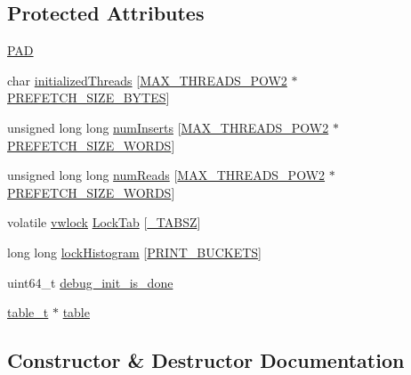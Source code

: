 \subsection*{Protected Attributes}
\begin{DoxyCompactItemize}
\item 
\hyperlink{classindex__base_aecdbc18775b6db4572392085e82e12d2}{P\+AD}
\item 
char \hyperlink{classindex__base_a2b876c502b9e52ab748db529dae6a403}{initialized\+Threads} \mbox{[}\hyperlink{plaf_8h_ac1585a3455dd3e33e877e588be9e466b}{M\+A\+X\+\_\+\+T\+H\+R\+E\+A\+D\+S\+\_\+\+P\+O\+W2} $\ast$\hyperlink{plaf_8h_a9492d3f4847aa8514510373df7ad0e73}{P\+R\+E\+F\+E\+T\+C\+H\+\_\+\+S\+I\+Z\+E\+\_\+\+B\+Y\+T\+ES}\mbox{]}
\item 
unsigned long long \hyperlink{classindex__base_a174339e599ecc8f223744c01ebeef0d3}{num\+Inserts} \mbox{[}\hyperlink{plaf_8h_ac1585a3455dd3e33e877e588be9e466b}{M\+A\+X\+\_\+\+T\+H\+R\+E\+A\+D\+S\+\_\+\+P\+O\+W2} $\ast$\hyperlink{plaf_8h_af55592679e3b40dd3c45ec6faef1b053}{P\+R\+E\+F\+E\+T\+C\+H\+\_\+\+S\+I\+Z\+E\+\_\+\+W\+O\+R\+DS}\mbox{]}
\item 
unsigned long long \hyperlink{classindex__base_ac947600e88bf99120d4a2bfb7e3be395}{num\+Reads} \mbox{[}\hyperlink{plaf_8h_ac1585a3455dd3e33e877e588be9e466b}{M\+A\+X\+\_\+\+T\+H\+R\+E\+A\+D\+S\+\_\+\+P\+O\+W2} $\ast$\hyperlink{plaf_8h_af55592679e3b40dd3c45ec6faef1b053}{P\+R\+E\+F\+E\+T\+C\+H\+\_\+\+S\+I\+Z\+E\+\_\+\+W\+O\+R\+DS}\mbox{]}
\item 
volatile \hyperlink{index__base_8h_a83d2222c5a48984baf95b9d9c50b23dc}{vwlock} \hyperlink{classindex__base_ab017238f575199c45f558d878f949635}{Lock\+Tab} \mbox{[}\hyperlink{index__base_8h_aaad4f00f49f1549864c4e86f2e2d38c8}{\+\_\+\+T\+A\+B\+SZ}\mbox{]}
\item 
long long \hyperlink{classindex__base_a2997801372bcddaa3ca891923833700c}{lock\+Histogram} \mbox{[}\hyperlink{index__base_8h_a4f19ac3a740945eca7da525767872383}{P\+R\+I\+N\+T\+\_\+\+B\+U\+C\+K\+E\+TS}\mbox{]}
\item 
uint64\+\_\+t \hyperlink{classindex__base_ad7276d1faf3b802ddd3ed0a0e8442e3f}{debug\+\_\+init\+\_\+is\+\_\+done}
\item 
\hyperlink{classtable__t}{table\+\_\+t} $\ast$ \hyperlink{classindex__base_abb51a82fc0bf85a82aa83376d111641f}{table}
\end{DoxyCompactItemize}


\subsection{Constructor \& Destructor Documentation}
\mbox{\label{classindex__base_a080b89f830ec83536c2a28103ebd5b28}} 
